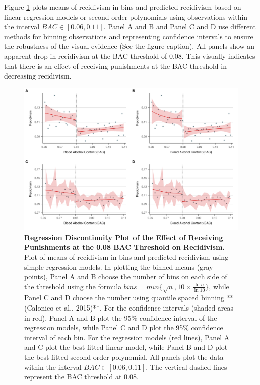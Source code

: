 \documentclass[
  11pt,
]{article}
\begin{document}
\endgroup

Figure \ref{fig:rdplot} plots means of recidivism in bins and predicted
recidivism based on linear regression models or second-order polynomials
using observations within the interval \(BAC \in [0.06, 0.11]\). Panel A
and B and Panel C and D use different methods for binning observations
and representing confidence intervals to ensure the robustness of the
visual evidence (See the figure caption). All panels show an apparent
drop in recidivism at the BAC threshold of 0.08. This visually indicates
that there is an effect of receiving punishments at the BAC threshold in
decreasing recidivism.

\begin{figure}[H]
  \centering
  \includegraphics[width=1\columnwidth]{../figures/combined.pdf}
  \caption{\textbf{Regression Discontinuity Plot of the Effect of Receiving Punishments at the 0.08 BAC Threshold on Recidivism.} Plot of means of recidivism in bins and predicted recidivism using simple regression models. In plotting the binned means (gray points), Panel A and B choose the number of bins on each side of the threshold using the formula $bins = min\{\sqrt{n}, 10 \times \frac{\ln{n}}{\ln{10}}\}$, while Panel C and D choose the number using quantile spaced binning **(Calonico et al., 2015)**. For the confidence intervals (shaded areas in red), Panel A and B plot the 95\% confidence interval of the regression models, while Panel C and D plot the 95\% confidence interval of each bin. For the regression models (red lines), Panel A and C plot the best fitted linear model, while Panel B and D plot the best fitted second-order polynomial. All panels plot the data within the interval $BAC \in [0.06, 0.11]$. The vertical dashed lines represent the BAC threshold at 0.08.}
  \label{fig:rdplot}
\end{figure}
\end{document}
